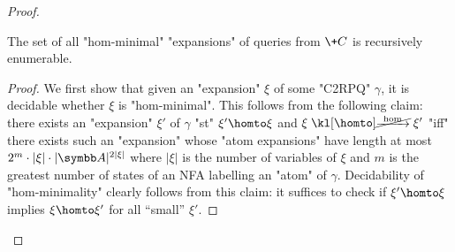 \begin{proof}
    \begin{proposition}
        The set of all "hom-minimal" "expansions" of queries from $\+C$ is recursively enumerable.
    \end{proposition}

    \begin{proof}
        \AP We first show that given an "expansion" $\xi$ of some "C2RPQ" $\gamma$, it is 
        decidable whether $\xi$ is "hom-minimal". This follows from the following claim:
        there exists an "expansion" $\xi'$ of $\gamma$ "st" $\xi' \homto \xi$ and
        $\xi \nothomto \xi'$ "iff"
        there exists such an "expansion" whose "atom expansions" have length at most
        $2^m \cdot |\xi|\cdot |\A|^{2|\xi|}$ where $|\xi|$ is the number of variables of $\xi$ and
        $m$ is the greatest number of states of an NFA labelling an "atom" of $\gamma$. 
        Decidability of "hom-minimality" clearly follows from this claim: it suffices to check if 
        $\xi' \homto \xi$ implies $\xi \homto \xi'$ for all ``small'' $\xi'$.


\end{proof}
\end{proof}
